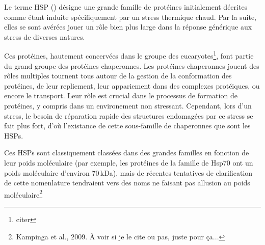 \cite{federhoffmann1999, zhang2011}

Le terme HSP () désigne une grande famille de
protéines initialement décrites comme étant induite spécifiquement par un
stress thermique chaud. Par la suite, elles se sont avérées jouer un rôle bien
plus large dans la réponse générique aux stress de diverses
natures\cite{sorensen2003}.


Ces protéines, hautement concervées dans le groupe des
eucaryotes\footnote{citer}, font partie du grand groupe des protéines
chaperonnes. Les protéines chaperonnes jouent des rôles multiples tournent
tous autour de la gestion de la conformation des protéines, de leur
repliement, leur appariement dans des complexes protéiques, ou encore le
transport.  Leur rôle est crucial dans le processus de formation de protéines,
y compris dans un environement non stressant. Cependant, lors d'un stress, le
besoin de réparation rapide des structures endomagées par ce stress se fait
plus fort, d'où l'existance de cette sous-famille de chaperonnes que sont les
HSPs.


Ces HSPs sont classiquement classées dans des grandes familles en fonction de
leur poids moléculaire (par exemple, les protéines de la famille de Hsp70 ont
un poids moléculaire d'environ 70\,kDa), mais de récentes tentatives de
clarification de cette nomenlature tendraient vers des noms ne faisant pas
allusion au poids moléculaire\footnote{Kampinga et al., 2009. À voir si je le
cite ou pas, juste pour ça...}



